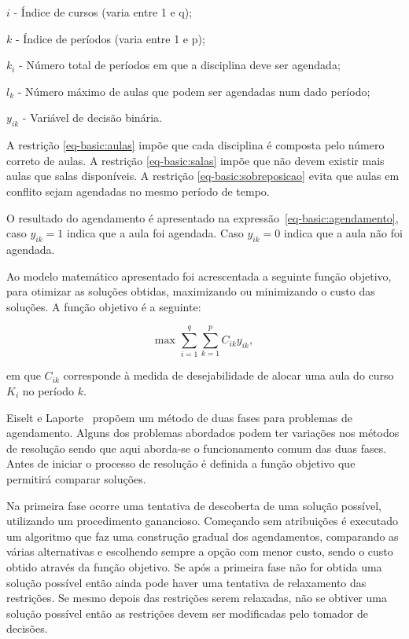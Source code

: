\begin{compactitem}
    \item $i$ - Índice de cursos (varia entre 1 e q);
    \item $k$ - Índice de períodos (varia entre 1 e p);
    \item $k_{i}$ - Número total de períodos em que a disciplina deve ser agendada;
    \item $l_{k}$ - Número máximo de aulas que podem ser agendadas num dado período;
    \item $y_{ik}$ - Variável de decisão binária.
\end{compactitem}

A restrição \eqref{eq-basic:aulas} impõe que cada disciplina é composta pelo número correto de aulas. A restrição \eqref{eq-basic:salas} impõe que não devem existir mais aulas que salas disponíveis. A restrição \eqref{eq-basic:sobreposicao} evita que aulas em conflito sejam agendadas no mesmo período de tempo.

O resultado do agendamento é apresentado na expressão~\eqref{eq-basic:agendamento}, caso $y_{ik} = 1$ indica que a aula foi agendada. Caso $y_{ik} = 0$ indica que a aula não foi agendada.

Ao modelo matemático apresentado foi acrescentada a seguinte função objetivo, para otimizar as soluções obtidas, maximizando ou minimizando o custo das soluções. A função objetivo é a seguinte:

\begin{equation}
    \text{max } \displaystyle\sum_{i=1}^{q} \displaystyle\sum_{k=1}^{p} C_{ik}y_{ik},
\end{equation}

em que $C_{ik}$ corresponde à medida de desejabilidade de alocar uma aula do curso $K_{i}$ no período $k$.

Eiselt e Laporte~\cite{CombinatorialOptimizationProblems-Eiselt-1987} propõem um método de duas fases para problemas de agendamento. Alguns dos problemas abordados podem ter variações nos métodos de resolução sendo que aqui aborda-se o funcionamento comum das duas fases. Antes de iniciar o processo de resolução é definida a função objetivo que permitirá comparar soluções.

Na primeira fase ocorre uma tentativa de descoberta de uma solução possível, utilizando um procedimento ganancioso. Começando sem atribuições é executado um algoritmo que faz uma construção gradual dos agendamentos, comparando as várias alternativas e escolhendo sempre a opção com menor custo, sendo o custo obtido através da função objetivo. Se após a primeira fase não for obtida uma solução possível então ainda pode haver uma tentativa de relaxamento das restrições. Se mesmo depois das restrições serem relaxadas, não se obtiver uma solução possível então as restrições devem ser modificadas pelo tomador de decisões.

